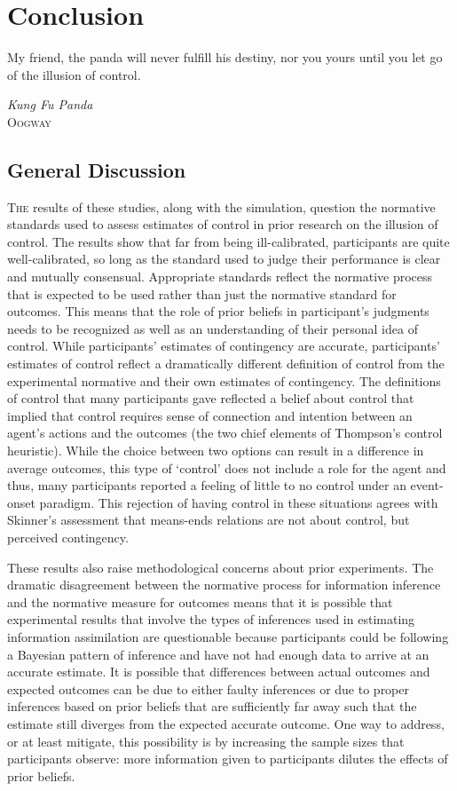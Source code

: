 \documentclass[USenglish,letterpaper,12pt,extrafontsizes,oneside,onecolumn,final]{memoir}
\begin{document}
\chapter{Conclusion}
\label{chap:conclusion}

\epigraph{\SingleSpacing My friend, the panda will never fulfill his destiny, nor you yours until you let go of the illusion of control.}{\textit{Kung Fu Panda}\\ \textsc{Oogway}}


\section{General Discussion}

\lettrine[lines=2,slope=-3pt,nindent=2pt]{T}{he} results of these studies, along with the simulation, question the normative standards used to assess estimates of control in prior research on the illusion of control. The results show that far from being ill-calibrated, participants are quite well-calibrated, so long as the standard used to judge their performance is clear and mutually consensual. Appropriate standards reflect the normative process that is expected to be used rather than just the normative standard for outcomes. This means that the role of prior beliefs in participant's judgments needs to be recognized as well as an understanding of their personal idea of control. While participants' estimates of contingency are accurate, participants' estimates of control reflect a dramatically different definition of control from the experimental normative and their own estimates of contingency. The definitions of control that many participants gave reflected a belief about control that implied that control requires sense of connection and intention between an agent's actions and the outcomes (the two chief elements of Thompson's control heuristic).  While the choice between two options can result in a difference in average outcomes, this type of `control' does not include a role for the agent and thus, many participants reported a feeling of little to no control under an event-onset paradigm. This rejection of having control in these situations agrees with Skinner's assessment that means-ends relations are not about control, but perceived contingency.

These results also raise methodological concerns about prior experiments.  The dramatic disagreement between the normative process for information inference and the normative measure for outcomes means that it is possible that experimental results that involve the types of inferences used in estimating information assimilation are questionable because participants could be following a Bayesian pattern of inference and have not had enough data to arrive at an accurate estimate.  It is possible that differences between actual outcomes and expected outcomes can be due to either faulty inferences or due to proper inferences based on prior beliefs that are sufficiently far away such that the estimate still diverges from the expected accurate outcome.  One way to address, or at least mitigate, this possibility is by increasing the sample sizes that participants observe:  more information given to participants dilutes the effects of prior beliefs.  
\end{document}

